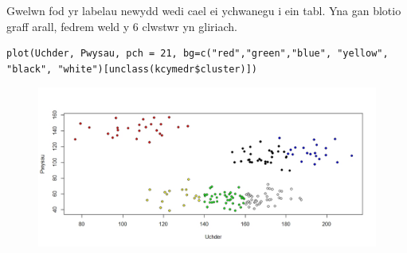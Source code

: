 Gwelwn fod yr labelau newydd wedi cael ei ychwanegu i ein tabl. Yna gan blotio graff arall, fedrem weld y 6 clwstwr yn gliriach.

\begin{verbatim}
plot(Uchder, Pwysau, pch = 21, bg=c("red","green","blue", "yellow", "black", "white")[unclass(kcymedr$cluster)])
\end{verbatim}

\begin{figure}[H]
\includegraphics[width=0.5\linewidth]{../img/6clwstwrR.jpeg}
\end{figure}



